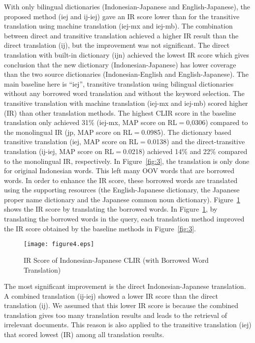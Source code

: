\documentclass[english]{jnlp_1.3c}
\begin{document}
With only bilingual dictionaries (Indonesian-Japanese and
English-Japanese), the proposed method (iej and ij-iej) gave an IR score
lower than for the transitive translation using machine translation
(iej-mx and iej-mb). The combination between direct and transitive
translation achieved a higher IR result than the direct translation
(ij), but the improvement was not significant. The direct translation
with built-in dictionary (ijn) achieved the lowest IR score which gives
conclusion that the new dictionary (Indonesian-Japanese) has lower
coverage than the two source dictionaries (Indonesian-English and
English-Japanese). The main baseline here is ``iej'', transitive
translation using bilingual dictionaries without any borrowed word
translation and without the keyword selection. The transitive
translation with machine translation (iej-mx and iej-mb) scored higher
(IR) than other translation methods. The highest CLIR score in the
baseline translation only achieved 31\% (iej-mx, MAP score on RL$=$0,0306) compared to the monolingual IR (jp, MAP score on RL$=$0.0985). The dictionary based transitive translation (iej, MAP score on
RL$=$0.0138) and the direct-transitive translation (ij-iej, MAP score on
RL$=$0.0218) achieved 14\% and 22\% compared to the monolingual IR,
respectively.  In Figure~\ref{fig:3}, the translation is only done for
original Indonesian words. This left many OOV words that are borrowed
words. In order to enhance the IR score, these borrowed words are
translated using the supporting resources (the English-Japanese
dictionary, the Japanese proper name dictionary and the Japanese common
noun dictionary). Figure~\ref{fig:4} shows the IR score by translating
the borrowed words. In Figure~\ref{fig:4}, by translating the borrowed
words in the query, each translation method improved the IR score
obtained by the baseline methods in Figure~\ref{fig:3}.

\begin{figure}[b]
  \begin{center}
    \texttt{[image: figure4.eps]}
  \end{center}
  \caption{IR Score of Indonesian-Japanese CLIR (with Borrowed Word Translation)}
  \label{fig:4}
\end{figure}


The most significant improvement is the direct Indonesian-Japanese
translation.  A combined translation (ij-iej) showed a lower IR score
than the direct translation (ij). We assumed that this lower IR score is
because the combined translation gives too many translation results and
leads to the retrieval of irrelevant documents. This reason is also
applied to the transitive translation (iej) that scored lowest (IR)
among all translation results.  
\end{document}
